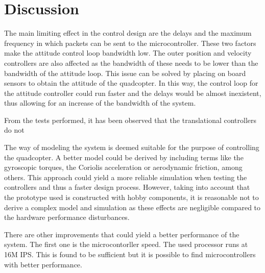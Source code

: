 \chapter{Discussion}
The main limiting effect in the control design are the delays and the maximum frequency in which packets can be sent to the microcontroller. These two factors make the attitude control loop bandwidth low. The outer position and velocity controllers are also affected as the bandwidth of these needs to be lower than the bandwidth of the attitude loop. This issue can be solved by placing on board sensors to obtain the attitude of the quadcopter. In this way, the control loop for the attitude controller could run faster and the delays would be almost inexistent, thus allowing for an increase of the bandwidth of the system.

From the tests performed, it has been observed that the translational controllers do not 

The way of modeling the system is deemed suitable for the purpose of controlling the quadcopter. A better model could be derived by including terms like the gyroscopic torques, the Coriolis acceleration or aerodynamic friction, among others. This approach could yield a more reliable simulation when testing the controllers and thus a faster design process. However, taking into account that the prototype used is constructed with hobby components, it is reasonable not to derive a complex model and simulation as these effects are negligible compared to the hardware performance disturbances. 

There are other improvements that could yield a better performance of the system. The first one is the microcontorller speed. The used processor runs at 16M IPS. This is found to be sufficient but it is possible to find microcontrollers with better performance.




